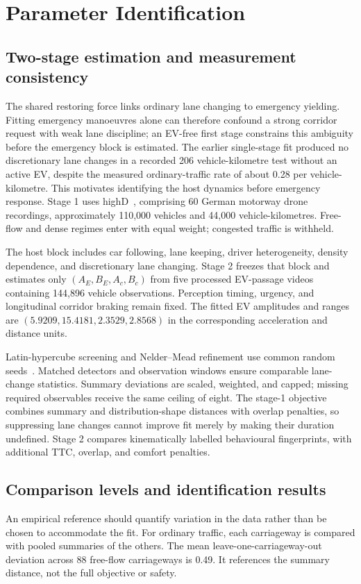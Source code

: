 \documentclass[conference,a4paper]{IEEEtran}
\begin{document}
\section{Parameter Identification}
\label{sec:ident}
\subsection{Two-stage estimation and measurement consistency}
The shared restoring force links ordinary lane changing to emergency yielding. Fitting emergency manoeuvres alone can therefore confound a strong corridor request with weak lane discipline; an EV-free first stage constrains this ambiguity before the emergency block is estimated.
The earlier single-stage fit produced no discretionary lane changes in a recorded 206 vehicle-kilometre test without an active EV, despite the measured ordinary-traffic rate of about 0.28 per vehicle-kilometre. This motivates identifying the host dynamics before emergency response. Stage 1 uses highD~\cite{krajewski18}, comprising 60 German motorway drone recordings, approximately 110,000 vehicles and 44,000 vehicle-kilometres. Free-flow and dense regimes enter with equal weight; congested traffic is withheld.

The host block includes car following, lane keeping, driver heterogeneity, density dependence, and discretionary lane changing. Stage 2 freezes that block and estimates only $(A_E,B_E,A_c,B_c)$ from five processed EV-passage videos containing 144,896 vehicle observations. Perception timing, urgency, and longitudinal corridor braking remain fixed. The fitted EV amplitudes and ranges are $(5.9209,15.4181,2.3529,2.8568)$ in the corresponding acceleration and distance units.

Latin-hypercube screening and Nelder--Mead refinement use common random seeds~\cite{mckay79}. Matched detectors and observation windows ensure comparable lane-change statistics. Summary deviations are scaled, weighted, and capped; missing required observables receive the same ceiling of eight. The stage-1 objective combines summary and distribution-shape distances with overlap penalties, so suppressing lane changes cannot improve fit merely by making their duration undefined. Stage 2 compares kinematically labelled behavioural fingerprints, with additional TTC, overlap, and comfort penalties.

\subsection{Comparison levels and identification results}
An empirical reference should quantify variation in the data rather than be chosen to accommodate the fit. For ordinary traffic, each carriageway is compared with pooled summaries of the others. The mean leave-one-carriageway-out deviation across 88 free-flow carriageways is 0.49. It references the summary distance, not the full objective or safety.
\end{document}
